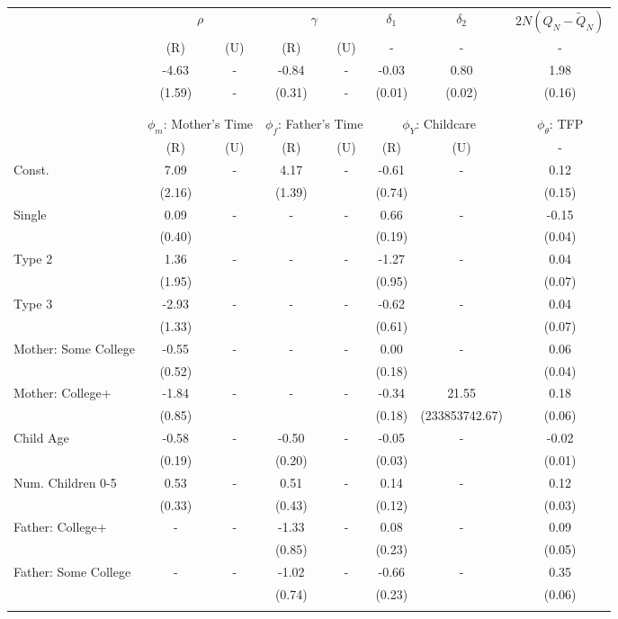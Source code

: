 \begin{tabular}{lccccccc}\toprule
 & \multicolumn{2}{c}{$\rho$} & \multicolumn{2}{c}{$\gamma$} & {$\delta_{1}$} & {$\delta_{2}$} & $2N(Q_{N} - \tilde{Q}_{N})$ \\
 & (R) & (U) & (R) & (U) & - & - & - \\\cmidrule(r){2-3}\cmidrule(r){4-5}\cmidrule(r){6-6}\cmidrule(r){7-7}\cmidrule(r){8-8}
&-4.63& - &-0.84& - &-0.03&0.80&1.98\\
&(1.59)& - &(0.31)& - &(0.01)&(0.02)&(0.16)\\
\\
&&&&&&&\\
 & \multicolumn{2}{c}{$\phi_{m}$: Mother's Time} & \multicolumn{2}{c}{$\phi_{f}$: Father's Time} & \multicolumn{2}{c}{$\phi_{Y}$: Childcare} &{$\phi_{\theta}$: TFP} \\
 & (R) & (U) & (R) & (U) & (R) & (U) & -  \\\cmidrule(r){2-3}\cmidrule(r){4-5}\cmidrule(r){6-7}\cmidrule(r){8-8}
Const.&7.09& -&4.17& -&-0.61& -&0.12\\
&(2.16)&&(1.39)&&(0.74)&&(0.15)\\
Single&0.09& -& - & -&0.66& -&-0.15\\
&(0.40)& & &&(0.19)&&(0.04)\\
Type 2&1.36& -& - & -&-1.27& -&0.04\\
&(1.95)& & &&(0.95)&&(0.07)\\
Type 3&-2.93& -& - & -&-0.62& -&0.04\\
&(1.33)& & &&(0.61)&&(0.07)\\
Mother: Some College&-0.55& -& - & -&0.00& -&0.06\\
&(0.52)& & &&(0.18)&&(0.04)\\
Mother: College+&-1.84& -& - & -&-0.34&21.55&0.18\\
&(0.85)& & &&(0.18)&(233853742.67)&(0.06)\\
Child Age&-0.58& -&-0.50& -&-0.05& -&-0.02\\
&(0.19)&&(0.20)&&(0.03)&&(0.01)\\
Num. Children 0-5&0.53& -&0.51& -&0.14& -&0.12\\
&(0.33)&&(0.43)&&(0.12)&&(0.03)\\
Father: College+& - & -&-1.33& -&0.08& -&0.09\\
 & &&(0.85)&&(0.23)&&(0.05)\\
Father: Some College& - & -&-1.02& -&-0.66& -&0.35\\
 & &&(0.74)&&(0.23)&&(0.06)\\
\\
\bottomrule\end{tabular}